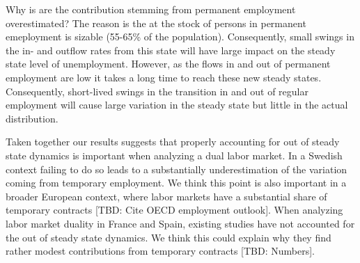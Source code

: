 Why is are the contribution stemming from permanent employment overestimated? The reason is the at the stock of persons in permanent emeployment is sizable (55-65\% of the population). Consequently, small swings in the in- and outflow rates from this state will have large impact on the steady state level of unemployment. However, as the flows in and out of permanent employment are low it takes a long time to reach these new steady states. Consequently, short-lived swings in the transition in and out of regular employment will cause large variation in the steady state but little in the actual distribution. 

Taken together our results suggests that properly accounting for out of steady state dynamics is important when analyzing a dual labor market. In a Swedish context failing to do so leads to a substantially underestimation of the variation coming from temporary employment. We think this point is also important in a broader European context, where labor markets have a substantial share of temporary contracts [TBD: Cite OECD employment outlook]. When analyzing labor market duality in France and Spain, existing studies \cite{Hairault2015, Silva2013} have not accounted for the out of steady state dynamics. We think this could explain why they find rather modest contributions from temporary contracts [TBD: Numbers].
